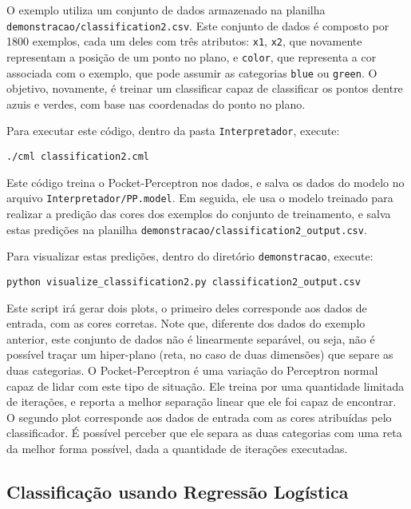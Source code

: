 \documentclass[12pt]{article}
\begin{document}
O exemplo utiliza um conjunto de dados armazenado na planilha \texttt{demonstracao/classification2.csv}. Este conjunto de dados é composto por 1800 exemplos, cada um deles com três atributos: \texttt{x1}, \texttt{x2}, que novamente representam a posição de um ponto no plano, e \texttt{color}, que representa a cor associada com o exemplo, que pode assumir as categorias \texttt{blue} ou \texttt{green}. O objetivo, novamente, é treinar um classificar capaz de classificar os pontos dentre azuis e verdes, com base nas coordenadas do ponto no plano. 

Para executar este código, dentro da pasta \texttt{Interpretador}, execute:

\begin{verbatim}
./cml classification2.cml
\end{verbatim}

Este código treina o Pocket-Perceptron nos dados, e salva os dados do modelo no arquivo \texttt{Interpretador/PP.model}. Em seguida, ele usa o modelo treinado para realizar a predição das cores dos exemplos do conjunto de treinamento, e salva estas predições na planilha \texttt{demonstracao/classification2\_output.csv}.

Para visualizar estas predições, dentro do diretório \texttt{demonstracao}, execute:

\begin{verbatim}
python visualize_classification2.py classification2_output.csv
\end{verbatim}

Este script irá gerar dois plots, o primeiro deles corresponde aos dados de entrada, com as cores corretas. Note que, diferente dos dados do exemplo anterior, este conjunto de dados não é linearmente separável, ou seja, não é possível traçar um hiper-plano (reta, no caso de duas dimensões) que separe as duas categorias. O Pocket-Perceptron é uma variação do Perceptron normal capaz de lidar com este tipo de situação. Ele treina por uma quantidade limitada de iterações, e reporta a melhor separação linear que ele foi capaz de encontrar. O segundo plot corresponde aos dados de entrada com as cores atribuídas pelo classificador. É possível perceber que ele separa as duas categorias com uma reta da melhor forma possível, dada a quantidade de iterações executadas.

\subsection{Classificação usando Regressão Logística}
\end{document}
